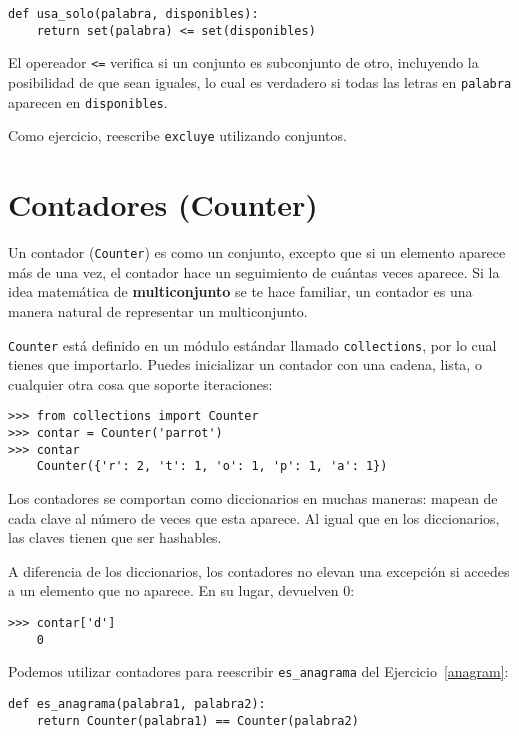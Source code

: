 \documentclass[10pt]{book}
\begin{document}
\begin{verbatim}
def usa_solo(palabra, disponibles):
    return set(palabra) <= set(disponibles)
\end{verbatim}
%
El opereador \verb"<=" verifica si un conjunto es subconjunto de otro,
incluyendo la posibilidad de que sean iguales, lo cual es verdadero si todas
las letras en {\tt palabra} aparecen en {\tt disponibles}.

Como ejercicio, reescribe \verb"excluye" utilizando conjuntos.


\section{Contadores (Counter)}

Un contador ({\tt Counter}) es como un conjunto, excepto que si un elemento aparece más
de una vez, el contador hace un seguimiento de cuántas veces aparece.
Si la idea matemática de {\bf multiconjunto} se te hace familiar,
un contador es una manera natural de representar un multiconjunto.

{\tt Counter} está definido en un módulo estándar llamado {\tt collections},
por lo cual tienes que importarlo.  Puedes inicializar un contador con una cadena,
lista, o cualquier otra cosa que soporte iteraciones:

\begin{verbatim}
>>> from collections import Counter
>>> contar = Counter('parrot')
>>> contar
    Counter({'r': 2, 't': 1, 'o': 1, 'p': 1, 'a': 1})
\end{verbatim}

Los contadores se comportan como diccionarios en muchas maneras: mapean de cada
clave al número de veces que esta aparece.  Al igual que en los diccionarios,
las claves tienen que ser hashables.

A diferencia de los diccionarios, los contadores no elevan una excepción si accedes a
un elemento que no aparece.  En su lugar, devuelven 0:

\begin{verbatim}
>>> contar['d']
    0
\end{verbatim}

Podemos utilizar contadores para reescribir \verb"es_anagrama" del
Ejercicio~\ref{anagram}:

\begin{verbatim}
def es_anagrama(palabra1, palabra2):
    return Counter(palabra1) == Counter(palabra2)
\end{verbatim}
\end{document}

